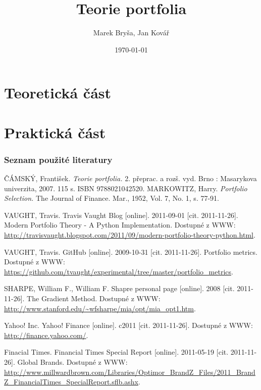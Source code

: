 \documentclass[xcolor=dvipsnames]{beamer}
\title{Teorie portfolia}
\author{Marek Bryša, Jan Kovář}
\institute
{
Masarykova Univerzita\\
Přírodovědecká fakulta
}
\date{\today}
\begin{document}
  \frame{\titlepage}
  \section{Teoretická část}
  
  \section{Praktická část}
  
  
  \renewcommand{\bibname}{Seznam použité literatury}
  \begin{frame}[shrink=15]
    \frametitle{Seznam použité literatury}
    \begin{thebibliography}{9}
        ČÁMSKÝ, František. \emph{Teorie portfolia.} 2. přeprac. a rozš. vyd. Brno : Masarykova univerzita, 2007. 115 s. ISBN 9788021042520.
        MARKOWITZ, Harry. \emph{Portfolio Selection.} The Journal of Finance. Mar., 1952, Vol. 7, No. 1, s. 77-91.
        
      VAUGHT, Travis. Travis Vaught Blog [online]. 2011-09-01 [cit. 2011-11-26]. Modern Portfolio Theory - A Python Implementation. Dostupné z WWW: \url{http://travisvaught.blogspot.com/2011/09/modern-portfolio-theory-python.html}.

      VAUGHT, Travis. GitHub [online]. 2009-10-31 [cit. 2011-11-26]. Portfolio metrics. Dostupné z WWW: \url{https://github.com/tvaught/experimental/tree/master/portfolio_metrics}.

      SHARPE, William F., William F. Shapre personal page [online]. 2008 [cit. 2011-11-26]. The Gradient Method. Dostupné z WWW: \url{http://www.stanford.edu/~wfsharpe/mia/opt/mia_opt1.htm}.

      Yahoo! Inc. Yahoo! Finance [online]. c2011 [cit. 2011-11-26]. Dostupné z WWW: \url{http://finance.yahoo.com/}.

      Finacial Times. Financial Times Special Report [online]. 2011-05-19 [cit. 2011-11-26]. Global Brands. Dostupné z WWW: \url{http://www.millwardbrown.com/Libraries/Optimor_BrandZ_Files/2011_BrandZ_FinancialTimes_SpecialReport.sflb.ashx}.
    \end{thebibliography}
  \end{frame}
\end{document}
